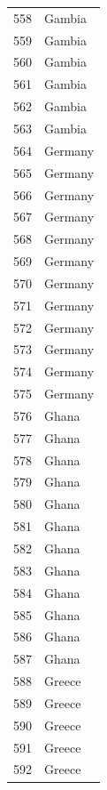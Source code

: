 \documentclass[
  letterpaper,
  DIV=11,
  numbers=noendperiod]{scrreprt}
\begin{document}
\begin{tabular}{ll}
558  &                    Gambia \\
559  &                    Gambia \\
560  &                    Gambia \\
561  &                    Gambia \\
562  &                    Gambia \\
563  &                    Gambia \\
564  &                   Germany \\
565  &                   Germany \\
566  &                   Germany \\
567  &                   Germany \\
568  &                   Germany \\
569  &                   Germany \\
570  &                   Germany \\
571  &                   Germany \\
572  &                   Germany \\
573  &                   Germany \\
574  &                   Germany \\
575  &                   Germany \\
576  &                     Ghana \\
577  &                     Ghana \\
578  &                     Ghana \\
579  &                     Ghana \\
580  &                     Ghana \\
581  &                     Ghana \\
582  &                     Ghana \\
583  &                     Ghana \\
584  &                     Ghana \\
585  &                     Ghana \\
586  &                     Ghana \\
587  &                     Ghana \\
588  &                    Greece \\
589  &                    Greece \\
590  &                    Greece \\
591  &                    Greece \\
592  &                    Greece \\

\end{tabular}
\end{document}
